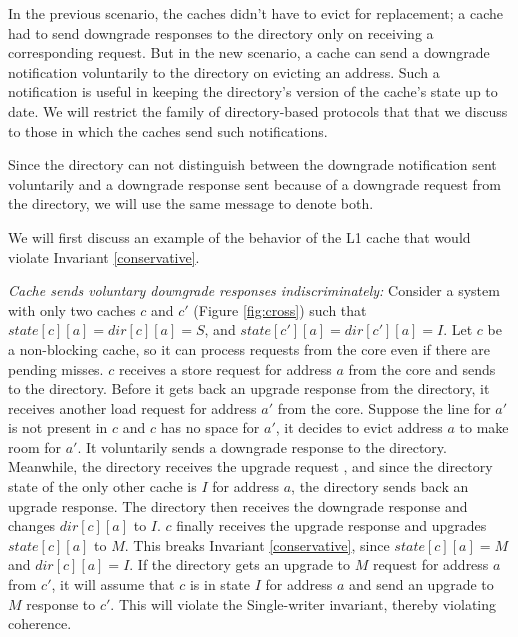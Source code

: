 In the previous scenario, the caches didn't have to evict for replacement; a
cache had to send downgrade responses to the directory only on receiving a
corresponding request. But in the new scenario, a cache can send a downgrade
notification voluntarily to the directory on evicting an address. Such a
notification is useful in keeping the directory's version of the cache's state
up to date. We will restrict the family of directory-based protocols that that
we discuss to those in which the caches send such notifications.

Since the directory can not distinguish between the downgrade notification sent
voluntarily and a downgrade response sent because of a downgrade request from
the directory, we will use the same message to denote both.

We will first discuss an example of the behavior of the L1 cache that would
violate Invariant \ref{conservative}.

\begin{scen}
\emph{Cache sends voluntary downgrade responses indiscriminately:}
Consider a system with only two caches $c$ and $c'$ (Figure \ref{fig:cross})
such that $state[c][a] = dir[c][a] = S$, and $state[c'][a] = dir[c'][a] = I$.
Let $c$ be a non-blocking cache, so it can process requests from the core even
if there are pending misses. $c$ receives a store request for address $a$ from
the core and sends  to the directory.  Before it gets back an
upgrade response from the directory, it receives another load request for
address $a'$ from the core. Suppose the line for $a'$ is not present in $c$ and
$c$ has no space for $a'$, it decides to evict address $a$ to make room for
$a'$. It voluntarily sends a downgrade response  to the
directory. Meanwhile, the directory receives the upgrade request
, and since the directory state of the only other cache is $I$
for address $a$, the directory sends back an upgrade response. The directory
then receives the downgrade response  and changes $dir[c][a]$
to $I$. $c$ finally receives the upgrade response  and
upgrades $state[c][a]$ to $M$. This breaks Invariant \ref{conservative}, since
$state[c][a] = M$ and $dir[c][a] = I$. If the directory gets an upgrade to $M$
request for address $a$ from $c'$, it will assume that $c$ is in state $I$ for
address $a$ and send an upgrade to $M$ response to $c'$. This will violate the
Single-writer invariant, thereby violating coherence.
\end{scen}

